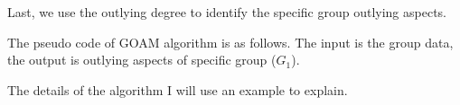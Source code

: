 \documentclass[
 size=14pt,
 paper=smartboard,  %
 mode=present, 		%
 display=slides, 	%
 style=tuliplab,  	%
 pauseslide,
 fleqn,leqno]{powerdot}
\begin{document}




\begin{note}
Last,
we use the outlying degree to identify the specific group outlying aspects.

The pseudo code of GOAM algorithm is as follows.
The input is the group data,
the output is outlying aspects of specific group ($G_1$).

The details of the algorithm I will use an example to explain.
\end{note}

\end{document}
